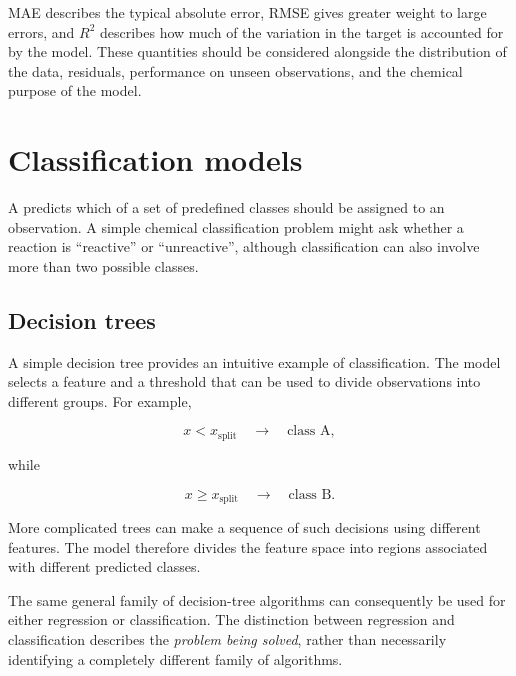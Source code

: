 \begin{warningbox}

  MAE describes the typical absolute error, RMSE gives greater weight to large errors, and \(R^2\) describes how much of the variation in the target is accounted for by the model.
  These quantities should be considered alongside the distribution of the data, residuals, performance on unseen observations, and the chemical purpose of the model.
\end{warningbox}

\section{Classification models}

A  predicts which of a set of predefined classes should be assigned to an observation.
A simple chemical classification problem might ask whether a reaction is \enquote{reactive} or \enquote{unreactive}, although classification can also involve more than two possible classes.

\subsection{Decision trees}

A simple decision tree provides an intuitive example of classification.
The model selects a feature and a threshold that can be used to divide observations into different groups.
For example,

\begin{equation}
  x < x_{\mathrm{split}} \quad \longrightarrow \quad \text{class A},
\end{equation}

while

\begin{equation}
  x \geq x_{\mathrm{split}} \quad \longrightarrow \quad \text{class B}.
\end{equation}

More complicated trees can make a sequence of such decisions using different features.
The model therefore divides the feature space into regions associated with different predicted classes.

The same general family of decision-tree algorithms can consequently be used for either regression or classification.
The distinction between regression and classification describes the \emph{problem being solved}, rather than necessarily identifying a completely different family of algorithms.

